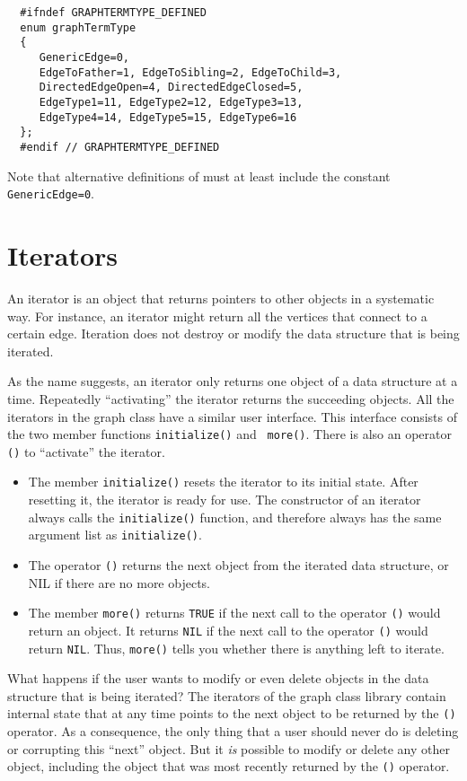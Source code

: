 {\footnotesize \begin{verbatim}
  #ifndef GRAPHTERMTYPE_DEFINED
  enum graphTermType
  {
     GenericEdge=0,
     EdgeToFather=1, EdgeToSibling=2, EdgeToChild=3,
     DirectedEdgeOpen=4, DirectedEdgeClosed=5,
     EdgeType1=11, EdgeType2=12, EdgeType3=13,
     EdgeType4=14, EdgeType5=15, EdgeType6=16
  };
  #endif // GRAPHTERMTYPE_DEFINED
\end{verbatim}}

Note that alternative definitions of  must at least include
the constant {\tt GenericEdge=0}.

\section{Iterators}
\label{s-iterators}
An iterator is an object that returns pointers to other objects in a systematic
way. For instance, an iterator might return all the vertices that connect to a
certain edge. Iteration does not destroy or modify the data structure that is
being iterated.

As the name suggests, an iterator only returns one object of a data structure
at a time. Repeatedly ``activating'' the iterator returns the succeeding
objects. All the iterators in the graph class have a similar user interface.
This interface consists of the two member functions {\tt initialize()} and {\tt
more()}. There is also an operator {\tt ()} to ``activate'' the iterator.
\begin{itemize}
\item
The member {\tt initialize()} resets the iterator to its initial state. After
resetting it, the iterator is ready for use. The constructor of an iterator
always calls the {\tt initialize()} function, and therefore always has the same
argument list as {\tt initialize()}.
\item
The operator {\tt ()} returns the next object from the iterated data structure,
or NIL if there are no more objects.
\item
The member {\tt more()} returns {\tt TRUE} if the next call to the operator
{\tt ()} would return an object. It returns {\tt NIL} if the next call to the
operator {\tt ()} would return {\tt NIL}. Thus, {\tt more()} tells you whether
there is anything left to iterate.
\end{itemize}
What happens if the user wants to modify or even delete objects in the data
structure that is being iterated? The iterators of the graph class library
contain internal state that at any time points to the next object to be
returned by the {\tt ()} operator. As a consequence, the only thing that a user
should never do is deleting or corrupting this ``next'' object. But it {\em is}
possible to modify or delete any other object, including the object that was
most recently returned by the {\tt ()} operator.

